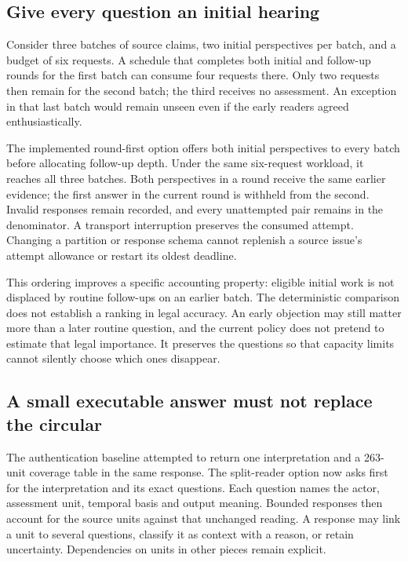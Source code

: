 \subsection{Give every question an initial hearing}

Consider three batches of source claims, two initial perspectives per batch,
and a budget of six requests. A schedule that completes both initial and
follow-up rounds for the first batch can consume four requests there. Only two
requests then remain for the second batch; the third receives no assessment.
An exception in that last batch would remain unseen even if the early readers
agreed enthusiastically.

The implemented round-first option offers both initial perspectives to every
batch before allocating follow-up depth. Under the same six-request workload,
it reaches all three batches. Both perspectives in a round receive the same
earlier evidence; the first answer in the current round is withheld from the
second. Invalid responses remain recorded, and every unattempted pair remains
in the denominator. A transport interruption preserves the consumed attempt.
Changing a partition or response schema cannot replenish a source issue's
attempt allowance or restart its oldest deadline.

This ordering improves a specific accounting property: eligible initial work
is not displaced by routine follow-ups on an earlier batch. The deterministic
comparison does not establish a ranking in legal accuracy. An early objection
may still matter more than a later routine question, and the current policy does
not pretend to estimate that legal importance. It preserves the questions so
that capacity limits cannot silently choose which ones disappear.

\subsection{A small executable answer must not replace the circular}

The authentication baseline attempted to return one interpretation and a
263-unit coverage table in the same response. The split-reader option now asks
first for the interpretation and its exact questions. Each question names the
actor, assessment unit, temporal basis and output meaning. Bounded responses
then account for the source units against that unchanged reading. A response
may link a unit to several questions, classify it as context with a reason, or
retain uncertainty. Dependencies on units in other pieces remain explicit.

